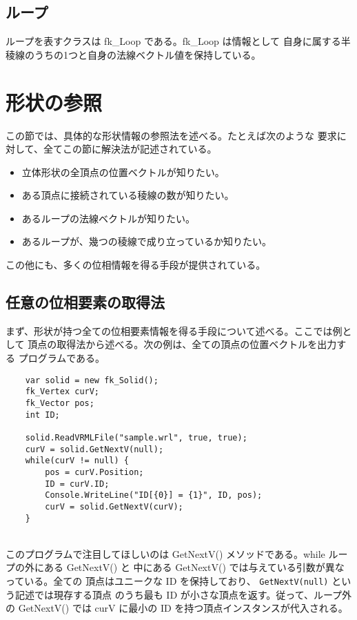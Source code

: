 \subsection{ループ}
ループを表すクラスは fk\_Loop である。fk\_Loop は情報として
自身に属する半稜線のうちの1つと自身の法線ベクトル値を保持している。

\section{形状の参照}
この節では、具体的な形状情報の参照法を述べる。たとえば次のような
要求に対して、全てこの節に解決法が記述されている。
\begin{itemize}
 \item 立体形状の全頂点の位置ベクトルが知りたい。
 \item ある頂点に接続されている稜線の数が知りたい。
 \item あるループの法線ベクトルが知りたい。
 \item あるループが、幾つの稜線で成り立っているか知りたい。
\end{itemize}
この他にも、多くの位相情報を得る手段が提供されている。

\subsection{任意の位相要素の取得法}
まず、形状が持つ全ての位相要素情報を得る手段について述べる。ここでは例として
頂点の取得法から述べる。次の例は、全ての頂点の位置ベクトルを出力する
プログラムである。
\\
\begin{breakbox}
\begin{verbatim}
    var solid = new fk_Solid();
    fk_Vertex curV;
    fk_Vector pos;
    int ID;

    solid.ReadVRMLFile("sample.wrl", true, true);
    curV = solid.GetNextV(null);
    while(curV != null) {
        pos = curV.Position;
        ID = curV.ID;
        Console.WriteLine("ID[{0}] = {1}", ID, pos);
        curV = solid.GetNextV(curV);
    }
\end{verbatim}
\end{breakbox}
~ \\
このプログラムで注目してほしいのは
GetNextV() メソッドである。while ループの外にある GetNextV() と
中にある GetNextV() では与えている引数が異なっている。全ての
頂点はユニークな ID を保持しており、
\verb+GetNextV(null)+ という記述では現存する頂点
のうち最も ID が小さな頂点を返す。従って、ループ外の GetNextV() では
curV に最小の ID を持つ頂点インスタンスが代入される。

